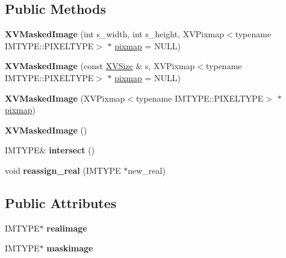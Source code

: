 \subsection*{Public Methods}
\begin{CompactItemize}
\item 
\label{XVMaskedImage_a0}
\hypertarget{class_XVMaskedImage_a0}{
{\bf XVMasked\-Image} (int s\_\-width, int s\_\-height, XVPixmap$<$typename IMTYPE::PIXELTYPE$>$ $\ast$ \hyperlink{class_XVImageBase_n1}{pixmap} = NULL)}

\item 
\label{XVMaskedImage_a1}
\hypertarget{class_XVMaskedImage_a1}{
{\bf XVMasked\-Image} (const \hyperlink{class_XVSize}{XVSize} \& s, XVPixmap$<$typename IMTYPE::PIXELTYPE$>$ $\ast$ \hyperlink{class_XVImageBase_n1}{pixmap} = NULL)}

\item 
\label{XVMaskedImage_a2}
\hypertarget{class_XVMaskedImage_a2}{
{\bf XVMasked\-Image} (XVPixmap$<$typename IMTYPE::PIXELTYPE$>$ $\ast$ \hyperlink{class_XVImageBase_n1}{pixmap})}

\item 
\label{XVMaskedImage_a3}
\hypertarget{class_XVMaskedImage_a3}{
{\bf XVMasked\-Image} ()}

\item 
\label{XVMaskedImage_a4}
\hypertarget{class_XVMaskedImage_a4}{
IMTYPE\& {\bf intersect} ()}

\item 
\label{XVMaskedImage_a5}
\hypertarget{class_XVMaskedImage_a5}{
void {\bf reassign\_\-real} (IMTYPE $\ast$new\_\-real)}

\end{CompactItemize}
\subsection*{Public Attributes}
\begin{CompactItemize}
\item 
IMTYPE$\ast$ {\bf realimage}
\item 
IMTYPE$\ast$ {\bf maskimage}
\end{CompactItemize}


